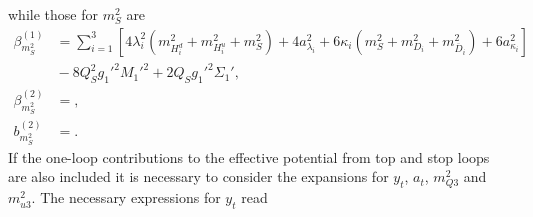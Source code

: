 \documentclass[preprint,amsmath,amssymb,aps,superscriptaddress,prd,showpacs,floatfix,nofootinbib]{revtex4-1}
\begin{document}
while those for $m_S^2$ are
\begin{subequations}
\begin{align}
\beta_{m_S^2}^{(1)}&=\sum_{i=1}^3\left [ 4\lambda_i^2\left ( m_{H_i^d}^2+m_{H_i^u}^2+m_S^2\right )+4a_{\lambda_i}^2+6\kappa_i\left ( m_S^2+m_{D_i}^2+m_{\overline{D}_i}^2\right )+6a_{\kappa_i}^2\right ]\nonumber\\
&{}-8Q_S^2g_1'^2M_1'^2+2Q_Sg_1'^2\Sigma_1',\label{eq:USSMms2BetaOneLoop}\\
\beta_{m_S^2}^{(2)}&=,\label{eq:USSMms2BetaTwoLoop}\\
b_{m_S^2}^{(2)}&=.\label{eq:USSMms2Ot2Coeff}
\end{align}
\end{subequations}
If the one-loop contributions to the effective potential from top and stop loops are also included it is necessary to consider the expansions for $y_t$, $a_t$, $m_{Q3}^2$ and $m_{u3}^2$. The necessary expressions for $y_t$ read
\end{document}
